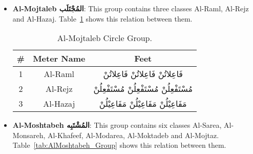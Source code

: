 \begin{itemize}


\item \textbf{Al-Mojtaleb \textarabic{المُجْتَلَب}}: This group contains three classes Al-Raml, Al-Rejz and Al-Hazaj. Table~\ref{tab:AlMojtaleb_Group} shows this relation between them.


\begin{table}[!ht]
  \centering
  \begin{tabular}{c c c}
    \hline
    \textbf{\#} & \textbf{Meter Name}  & \textbf{Feet} \\
    \hline
    1 & \textarabic{Al-Raml} & \textarabic{فَاعِلاتُنْ فَاعِلاتُنْ فَاعِلاتُنْ}\\
    2 &\textarabic{Al-Rejz}&  \textarabic{مُسْتَفْعِلُنْ مُسْتَفْعِلُنْ مُسْتَفْعِلُنْ}\\
    3 &\textarabic{Al-Hazaj}  & \textarabic{مَفَاعِيْلُنْ مَفَاعِيْلُنْ مَفَاعِيْلُنْ}\\
    \hline                                                
  \end{tabular}
\caption{Al-Mojtaleb Circle Group.}\label{tab:AlMojtaleb_Group}
\end{table}
    
  


\item \textbf{Al-Moshtabeh \textarabic{المُشْتَبِه}}: This group contains six classes Al-Sarea, Al-Monsareh, Al-Khafeef, Al-Modarea, Al-Moktadeb and Al-Mojtaz. Table~\ref{tab:AlMoshtabeh_Group} shows this relation between them.



\end{itemize}
